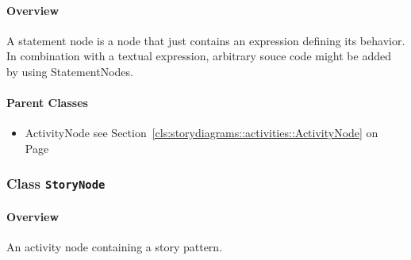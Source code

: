 \paragraph{Overview}

	
			
A statement node is a node that just contains an expression defining its behavior. In combination with a textual expression, arbitrary souce code might be added by using StatementNodes.	
		
	



\paragraph{Parent Classes}
\begin{itemize}
\item ActivityNode see Section~\ref{cls:storydiagrams::activities::ActivityNode} on Page~\pageref{cls:storydiagrams::activities::ActivityNode}\end{itemize}
\subsubsection{\Large{Class \bfseries \texttt{StoryNode}\normalfont}}
\label{cls:storydiagrams::activities::StoryNode} 
\paragraph{Overview}

	
			
An activity node containing a story pattern.	
		
	


